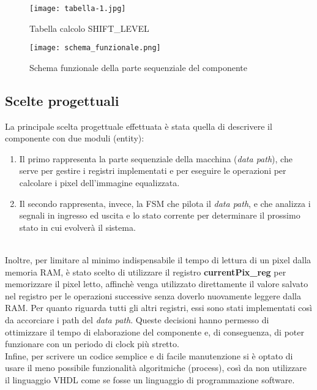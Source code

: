 \documentclass{article}
\begin{document}
\begin{figure} [H]
	\centering
	\caption{Tabella calcolo SHIFT\_LEVEL}
	\texttt{[image: tabella-1.jpg]}
	\label{fig:Tabella}
\end{figure}

\begin{figure}[H]
	\centering
	\caption{Schema funzionale della parte sequenziale del componente}
	\texttt{[image: schema\_funzionale.png]}
	\label{fig:Schema}
\end{figure}

\subsection{Scelte progettuali}
La principale scelta progettuale effettuata è stata quella di descrivere il componente con due moduli (entity): \\
\begin{enumerate}
	\item Il primo rappresenta la parte sequenziale della macchina (\textit{data path}), che serve per gestire i registri implementati e per eseguire le operazioni per calcolare i pixel dell'immagine equalizzata.
	\item Il secondo rappresenta, invece, la FSM che pilota il \textit{data path}, e che analizza i segnali in ingresso ed uscita e lo stato corrente per determinare il prossimo stato in cui evolverà il sistema.
\end{enumerate}

\noindent \\Inoltre, per limitare al minimo indispensabile il tempo di lettura di un pixel dalla memoria RAM, è stato scelto di utilizzare il registro \textbf{currentPix\_reg} per memorizzare il pixel letto, affinchè venga utilizzato direttamente il valore salvato nel registro per le operazioni successive senza doverlo nuovamente leggere dalla RAM. Per quanto riguarda tutti gli altri registri, essi sono stati implementati così da accorciare i path del \textit{data path}. Queste decisioni hanno permesso di ottimizzare il tempo di elaborazione del componente e, di conseguenza, di poter funzionare con un periodo di clock più stretto. \\
Infine, per scrivere un codice semplice e di facile manutenzione si è optato di usare il meno possibile funzionalità algoritmiche (process), così da non utilizzare il linguaggio VHDL come se fosse un linguaggio di programmazione software. \\
\end{document}
